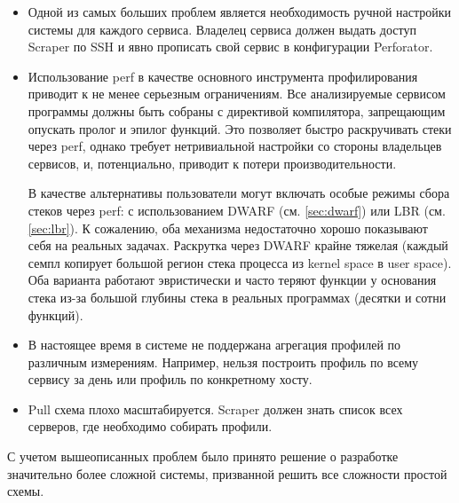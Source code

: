 \begin{itemize}
    \item
        Одной из самых больших проблем является необходимость ручной настройки системы для каждого сервиса.
        Владелец сервиса должен выдать доступ Scraper по SSH и явно прописать свой сервис в конфигурации Perforator.

    \item
        Использование perf в качестве основного инструмента профилирования приводит к не менее серьезным ограничениям.
        Все анализируемые сервисом программы должны быть собраны с директивой компилятора, запрещающим опускать пролог и эпилог функций.
        Это позволяет быстро раскручивать стеки через perf, однако требует нетривиальной настройки со стороны владельцев сервисов, и,
        потенциально, приводит к потери производительности.

        В качестве альтернативы пользователи могут включать особые режимы сбора стеков через perf: с использованием
        DWARF (см. \ref{sec:dwarf}) или LBR (см. \ref{sec:lbr}).
        К сожалению, оба механизма недостаточно хорошо показывают себя на реальных задачах.
        Раскрутка через DWARF крайне тяжелая (каждый семпл копирует большой регион стека процесса из kernel space в user space).
        Оба варианта работают эвристически и часто теряют функции у основания стека из-за большой глубины стека в реальных программах
        (десятки и сотни функций).

    \item
        В настоящее время в системе не поддержана агрегация профилей по различным измерениям.
        Например, нельзя построить профиль по всему сервису за день или профиль по конкретному хосту.

    \item
        Pull схема плохо масштабируется. Scraper должен знать список всех серверов, где необходимо собирать профили.
\end{itemize}

С учетом вышеописанных проблем было принято решение о разработке значительно более сложной системы, призванной решить
все сложности простой схемы.
